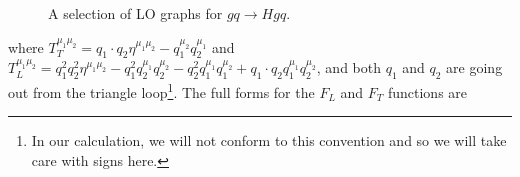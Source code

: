 \begin{figure}[t]
\caption{A selection of LO graphs for $gq \to Hgq$.}
\label{fig:qgh_lo}
\end{figure}
where $ T_T^{\mu_1 \mu_2} = q_1 \cdot q_2 \eta^{\mu_1 \mu_2} - q_1^{\mu_2} q_2^{\mu_1} $ and $T_L^{\mu_1 \mu_2} = q_1^2 q_2^2 \eta^{\mu_1 \mu_2} - q_1^2 q_2^{\mu_1} q_2^{\mu_2} - q_2^2 q_1^{\mu_1} q_1^{\mu_2} + q_1 \cdot q_2 q_1^{\mu_1} q_2^{\mu_2}$, and both $q_1$ and $q_2$ are going out from the triangle loop\footnote{In our calculation, we will not conform to this convention and so we will take care with signs here.}. The full forms for the $F_L$ and $F_T$ functions are

